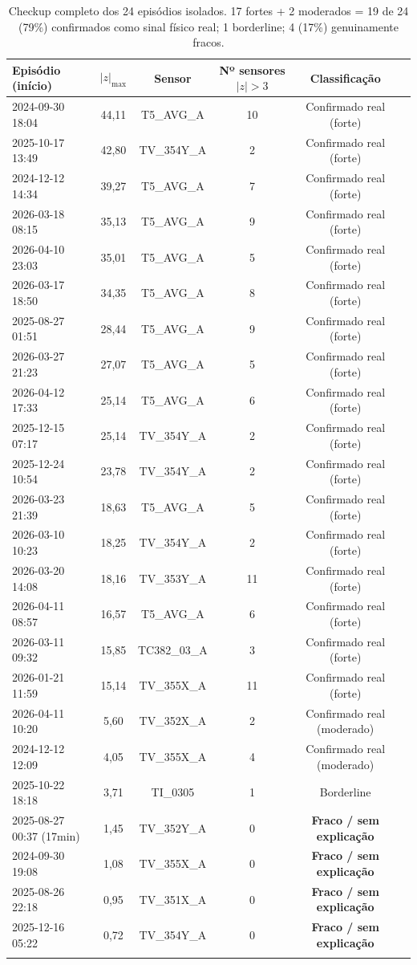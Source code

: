 \documentclass[11pt,a4paper]{article}
\begin{document}
{\small
\begin{longtable}{lccccl}
\toprule
\textbf{Episódio (início)} & \textbf{$|z|_{\max}$} & \textbf{Sensor} & \textbf{Nº sensores $|z|{>}3$} & \textbf{Classificação} \\
\midrule
\endhead
2024-09-30 18:04 & 44,11 & T5\_AVG\_A & 10 & Confirmado real (forte) \\
2025-10-17 13:49 & 42,80 & TV\_354Y\_A & 2 & Confirmado real (forte) \\
2024-12-12 14:34 & 39,27 & T5\_AVG\_A & 7 & Confirmado real (forte) \\
2026-03-18 08:15 & 35,13 & T5\_AVG\_A & 9 & Confirmado real (forte) \\
2026-04-10 23:03 & 35,01 & T5\_AVG\_A & 5 & Confirmado real (forte) \\
2026-03-17 18:50 & 34,35 & T5\_AVG\_A & 8 & Confirmado real (forte) \\
2025-08-27 01:51 & 28,44 & T5\_AVG\_A & 9 & Confirmado real (forte) \\
2026-03-27 21:23 & 27,07 & T5\_AVG\_A & 5 & Confirmado real (forte) \\
2026-04-12 17:33 & 25,14 & T5\_AVG\_A & 6 & Confirmado real (forte) \\
2025-12-15 07:17 & 25,14 & TV\_354Y\_A & 2 & Confirmado real (forte) \\
2025-12-24 10:54 & 23,78 & TV\_354Y\_A & 2 & Confirmado real (forte) \\
2026-03-23 21:39 & 18,63 & T5\_AVG\_A & 5 & Confirmado real (forte) \\
2026-03-10 10:23 & 18,25 & TV\_354Y\_A & 2 & Confirmado real (forte) \\
2026-03-20 14:08 & 18,16 & TV\_353Y\_A & 11 & Confirmado real (forte) \\
2026-04-11 08:57 & 16,57 & T5\_AVG\_A & 6 & Confirmado real (forte) \\
2026-03-11 09:32 & 15,85 & TC382\_03\_A & 3 & Confirmado real (forte) \\
2026-01-21 11:59 & 15,14 & TV\_355X\_A & 11 & Confirmado real (forte) \\
2026-04-11 10:20 & 5,60 & TV\_352X\_A & 2 & Confirmado real (moderado) \\
2024-12-12 12:09 & 4,05 & TV\_355X\_A & 4 & Confirmado real (moderado) \\
2025-10-22 18:18 & 3,71 & TI\_0305 & 1 & Borderline \\
2025-08-27 00:37 (17min) & 1,45 & TV\_352Y\_A & 0 & \textbf{Fraco / sem explicação} \\
2024-09-30 19:08 & 1,08 & TV\_355X\_A & 0 & \textbf{Fraco / sem explicação} \\
2025-08-26 22:18 & 0,95 & TV\_351X\_A & 0 & \textbf{Fraco / sem explicação} \\
2025-12-16 05:22 & 0,72 & TV\_354Y\_A & 0 & \textbf{Fraco / sem explicação} \\
\bottomrule
\caption{Checkup completo dos 24 episódios isolados. 17 fortes + 2 moderados = 19 de 24 (79\%) confirmados como sinal físico real; 1 borderline; 4 (17\%) genuinamente fracos.}
\end{longtable}
}
\end{document}
